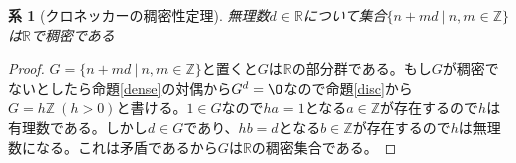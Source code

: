 \documentclass[leqno]{jsarticle}
\newtheorem{cor}[thm]{系}
\newcommand{\zz}{\mathbb{Z}}
\newcommand{\rr}{\mathbb{R}}
\begin{document}
\begin{cor}[クロネッカーの稠密性定理]
無理数$d\in \rr$について集合$\{n+md\ |\ n,m\in \zz\}$は$\rr$で稠密である
\end{cor}
\begin{proof}
$G=\{n+md\ |\ n,m\in \zz\}$と置くと$G$は$\rr$の部分群である。もし$G$が稠密でないとしたら命題\ref{dense}の対偶から$G^d=\O$なので命題\ref{disc}から$G=h\zz\ (h>0)$と書ける。$1\in G$なので$ha=1$となる$a\in \zz$が存在するので$h$は有理数である。しかし$d\in G$であり、$hb=d$となる$b\in \zz$が存在するので$h$は無理数になる。これは矛盾であるから$G$は$\rr$の稠密集合である。
\end{proof}





































			
\end{document}
